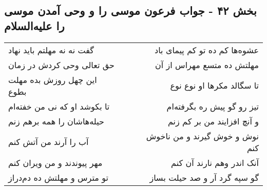 \begin{center}
\section*{بخش ۴۲ - جواب فرعون موسی را و وحی  آمدن موسی را علیه‌السلام}
\label{sec:sh042}
\begin{longtable}{l p{0.5cm} r}
گفت نه نه مهلتم باید نهاد
&&
عشوه‌ها کم ده تو کم پیمای باد
\\
حق تعالی وحی کردش در زمان
&&
مهلتش ده متسع مهراس از آن
\\
این چهل روزش بده مهلت بطوع
&&
تا سگالد مکرها او نوع نوع
\\
تا بکوشد او که نی من خفته‌ام
&&
تیز رو گو پیش ره بگرفته‌ام
\\
حیله‌هاشان را همه برهم زنم
&&
و آنچ افزایند من بر کم زنم
\\
آب را آرند من آتش کنم
&&
نوش و خوش گیرند و من ناخوش کنم
\\
مهر پیوندند و من ویران کنم
&&
آنک اندر وهم نارند آن کنم
\\
تو مترس و مهلتش ده دم‌دراز
&&
گو سپه گرد آر و صد حیلت بساز
\\
\end{longtable}
\end{center}
